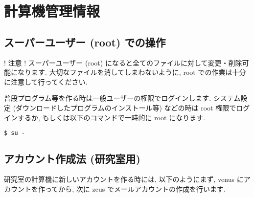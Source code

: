 \documentclass{jarticle}
\begin{document}
\section{計算機管理情報}

\subsection{スーパーユーザー (root) での操作}

! 注意 ! スーパーユーザー (root) になると全てのファイルに対して変更・削除可能になります.
大切なファイルを消してしまわないように, root での作業は十分に注意して行ってください.

普段プログラム等を作る時は一般ユーザーの権限でログインします.
システム設定 (ダウンロードしたプログラムのインストール等) などの時は root
権限でログインするか, もしくは以下のコマンドで一時的に root になります.
\begin{verbatim}
$ su -
\end{verbatim}


\subsection{アカウント作成法 (研究室用)}
研究室の計算機に新しいアカウントを作る時には, 以下のようにまず, venus
にアカウントを作ってから, 次に zeus でメールアカウントの作成を行います.
\end{document}
